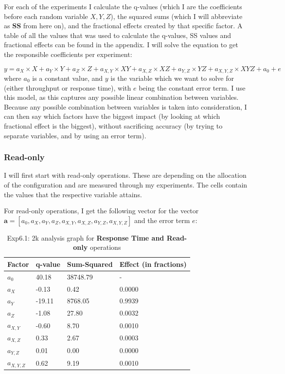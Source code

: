 \documentclass[11pt,a4paper]{article}
\begin{document}
For each of the experiments I calculate the q-values (which I are the coefficients before each random variable $X, Y, Z$), the squared sums (which I will abbreviate as \textbf{SS} from here on), and the fractional effects created by that specific factor.
A table of all the values that was used to calculate the q-values, SS values and fractional effects can be found in the appendix.
I will solve the equation to get the responsible coefficients per experiment:

\begin{equation}
	y = a_X \times X + a_Y \times Y + a_Z \times Z + a_{X, Y} \times X Y + a_{X, Z} \times X Z + a_{Y, Z} \times Y Z + a_{X, Y, Z} \times X Y Z + a_0 + e
\end{equation}
where $a_0$ is a constant value, and $y$ is the variable which we want to solve for (either throughput or response time), with $e$ being the constant error term.
I use this model, as this captures any possible linear combination between variables.
Because any possible combination between variables is taken into consideration, I can then say which factors have the biggest impact (by looking at which fractional effect is the biggest), without sacrificing accuracy (by trying to separate variables, and by using an error term).

\subsubsection{Read-only}

I will first start with read-only operations.
These are depending on the allocation of the configuration and are measured through my experiments.
The cells contain the values that the respective variable attains.

For read-only operations, I get the following vector for the vector $\mathbf{a} = 
[a_0, a_X, a_Y, a_Z, a_{X, Y}, a_{X, Z}, a_{Y, Z}, a_{X, Y, Z}] $ and the error term $e$:
\begin{center}
	\begin{table}[H]
	\center
    \begin{tabular}{ | l | l | l | l |  }
    \hline
    Factor & q-value & Sum-Squared & Effect (in fractions) \\ \hline
    $a_0$ & 40.18 & 38748.79 & - \\ \hline
    $a_X$ & -0.13 & 0.42 & 0.0000 \\ \hline
    $a_Y$ & -19.11 & 8768.05 & 0.9939 \\ \hline
    $a_Z$ & -1.08  & 27.80 & 0.0032 \\ \hline
   	$a_{X, Y}$ & -0.60 & 8.70 & 0.0010 \\ \hline
    $a_{X, Z}$ & 0.33 & 2.67 & 0.0003 \\ \hline
    $a_{Y, Z}$ & 0.01 & 0.00 & 0.0000 \\ \hline
    $a_{X, Y, Z}$ & 0.62 & 9.19 & 0.0010 \\
    \hline
    \end{tabular}
  	\caption{Exp6.1: 2k analysis graph for \textbf{Response Time and Read-only} operations}	 
  	\end{table}  
\end{center}
\end{document}
